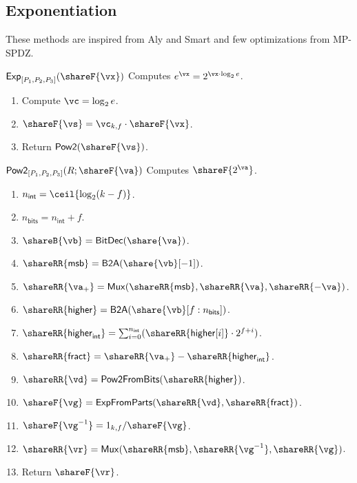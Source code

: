 \subsection{Exponentiation}
\label{subsec:exp}

These methods are inspired from Aly and Smart \cite{ACNS:AlySma19} and few
optimizations from MP-SPDZ.

\msubsubsection
  {$\mathsf{Exp}_{[P_1, P_2, P_3]}(\shareF{\vx})$}
  Computes $e^\vx = 2^{ \vx \cdot \log_2{e}}$.
\begin{enumerate}
	\item Compute $\vc = \log_2{e}$.
	\item $\shareF{\vs} = \vc_{k, f} \cdot \shareF{\vx}$.
	\item Return $\mathsf{Pow2}(\shareF{\vs})$.
\end{enumerate}


\msubsubsection
  {$\mathsf{Pow2}_{[P_1, P_2, P_3]}(R; \shareF{\va})$}
  Computes $\shareF{2^\va}$.
\begin{enumerate}
	\item $n_{\mathsf{int}} = \ceil{\log_2({k - f})}$.
	\item $n_{\mathsf{bits}} = n_{\mathsf{int}} + f$.
	\item $\shareB{\vb} = \mathsf{BitDec}(\share{\va})$.
	\item $\shareRR{\mathsf{msb}} = \mathsf{B2A}(\share{\vb}[-1])$.
	\item $\shareRR{\va_+} = \mathsf{Mux}(\shareRR{\mathsf{msb}}, \shareRR{\va}, \shareRR{-\va})$.
	\item $\shareRR{\mathsf{higher}} = \mathsf{B2A}(\share{\vb}[f:n_\mathsf{bits}])$.
	\item $\shareRR{\mathsf{higher}_{\mathsf{int}}} = \sum_{i=0}^{n_\mathsf{int}}(\shareRR{\mathsf{higher}[i]} \cdot 2^{f + i})$.
	\item $\shareRR{\mathsf{fract}} = \shareRR{\va_+} - \shareRR{\mathsf{higher}_\mathsf{int}}$.
	\item $\shareRR{\vd} = \mathsf{Pow2FromBits}(\shareRR{\mathsf{higher}})$.
	\item $\shareF{\vg} = \mathsf{ExpFromParts}(\shareRR{\vd},\shareRR{\mathsf{fract}})$.
	\item $\shareF{\vg^{-1}} = 1_{k,f} / \shareF{\vg}$.
	\item $\shareRR{\vr} = \mathsf{Mux}(\shareRR{\mathsf{msb}}, \shareRR{\vg^{-1}}, \shareRR{\vg})$.
	\item Return $\shareF{\vr}$.
\end{enumerate}


